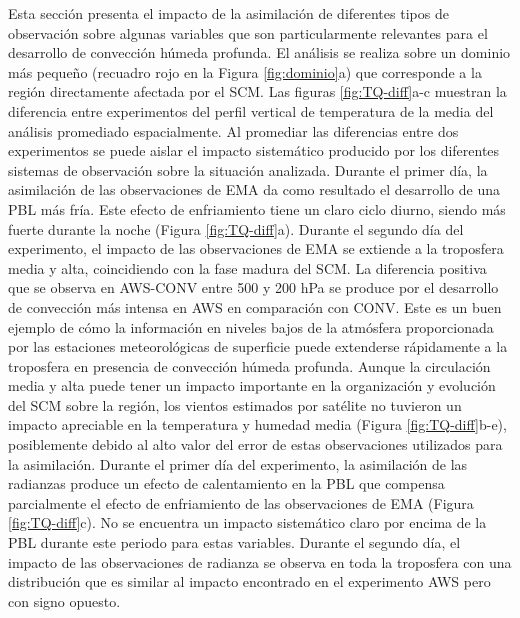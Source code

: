 \documentclass[12pt,oneside,a4paper]{reedthesis}
\begin{document}
Esta sección presenta el impacto de la asimilación de diferentes tipos de observación sobre algunas variables que son particularmente relevantes para el desarrollo de convección húmeda profunda. El análisis se realiza sobre un dominio más pequeño (recuadro rojo en la Figura \ref{fig:dominio}a) que corresponde a la región directamente afectada por el SCM. Las figuras \ref{fig:TQ-diff}a-c muestran la diferencia entre experimentos del perfil vertical de temperatura de la media del análisis promediado espacialmente. Al promediar las diferencias entre dos experimentos se puede aislar el impacto sistemático producido por los diferentes sistemas de observación sobre la situación analizada. Durante el primer día, la asimilación de las observaciones de EMA da como resultado el desarrollo de una PBL más fría. Este efecto de enfriamiento tiene un claro ciclo diurno, siendo más fuerte durante la noche (Figura \ref{fig:TQ-diff}a). Durante el segundo día del experimento, el impacto de las observaciones de EMA se extiende a la troposfera media y alta, coincidiendo con la fase madura del SCM. La diferencia positiva que se observa en AWS-CONV entre 500 y 200 hPa se produce por el desarrollo de convección más intensa en AWS en comparación con CONV. Este es un buen ejemplo de cómo la información en niveles bajos de la atmósfera proporcionada por las estaciones meteorológicas de superficie puede extenderse rápidamente a la troposfera en presencia de convección húmeda profunda. Aunque la circulación media y alta puede tener un impacto importante en la organización y evolución del SCM sobre la región, los vientos estimados por satélite no tuvieron un impacto apreciable en la temperatura y humedad media (Figura \ref{fig:TQ-diff}b-e), posiblemente debido al alto valor del error de estas observaciones utilizados para la asimilación.
Durante el primer día del experimento, la asimilación de las radianzas produce un efecto de calentamiento en la PBL que compensa parcialmente el efecto de enfriamiento de las observaciones de EMA (Figura \ref{fig:TQ-diff}c). No se encuentra un impacto sistemático claro por encima de la PBL durante este periodo para estas variables. Durante el segundo día, el impacto de las observaciones de radianza se observa en toda la troposfera con una distribución que es similar al impacto encontrado en el experimento AWS pero con signo opuesto.
\end{document}
